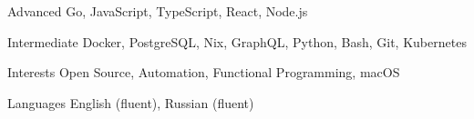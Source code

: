 
\begin{cvskills}

  \cvskill
    {Advanced}
    {Go, JavaScript, TypeScript, React, Node.js}

    \cvskill
    {Intermediate}
    {Docker, PostgreSQL, Nix, GraphQL, Python, Bash, Git, Kubernetes}

   \cvskill
    {Interests}
    {Open Source, Automation, Functional Programming, macOS}

  \cvskill
    {Languages}
    {English (fluent), Russian (fluent)}

\end{cvskills}
